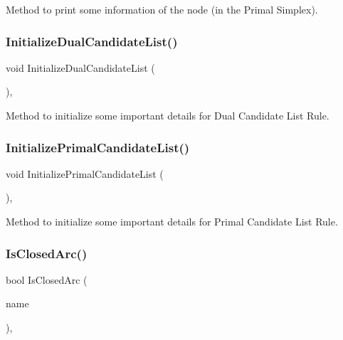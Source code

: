 Method to print some information of the node (in the Primal Simplex). \mbox{\label{class_m_c_f_simplex_ac26e76879ac7ff8b94c143fa014d46b5}} 
\subsubsection{\texorpdfstring{Initialize\+Dual\+Candidate\+List()}{InitializeDualCandidateList()}}
{\footnotesize\ttfamily void Initialize\+Dual\+Candidate\+List (\begin{DoxyParamCaption}\item[{void}]{ }\end{DoxyParamCaption})\hspace{0.3cm}{\ttfamily [inline]}, {\ttfamily [private]}}

Method to initialize some important details for Dual Candidate List Rule. \mbox{\label{class_m_c_f_simplex_a24c14a4a1305b97620ee43301a2a7b96}} 
\subsubsection{\texorpdfstring{Initialize\+Primal\+Candidate\+List()}{InitializePrimalCandidateList()}}
{\footnotesize\ttfamily void Initialize\+Primal\+Candidate\+List (\begin{DoxyParamCaption}\item[{void}]{ }\end{DoxyParamCaption})\hspace{0.3cm}{\ttfamily [inline]}, {\ttfamily [private]}}

Method to initialize some important details for Primal Candidate List Rule. \mbox{\label{class_m_c_f_simplex_a95d97fdf20e0075a8deda52f4925072a}} 
\subsubsection{\texorpdfstring{Is\+Closed\+Arc()}{IsClosedArc()}}
{\footnotesize\ttfamily bool Is\+Closed\+Arc (\begin{DoxyParamCaption}\item[{\mbox{\hyperlink{class_m_c_f_class_a76aaabb20535c51a2752b93f6c38fe54}{c\+Index}}}]{name }\end{DoxyParamCaption})\hspace{0.3cm}{\ttfamily [override]}, {\ttfamily [virtual]}}

